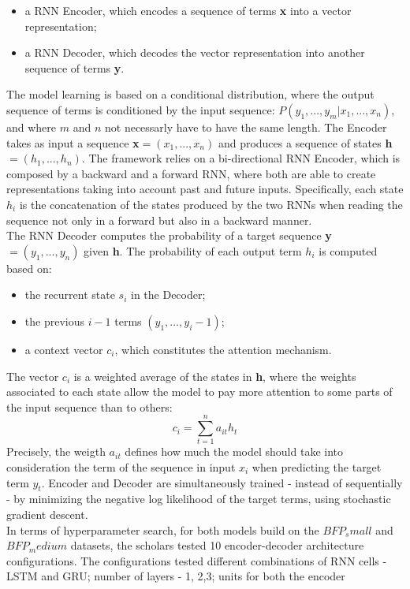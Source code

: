 \begin{itemize}
    \item a RNN Encoder, which encodes a sequence of terms \textbf{x} into a vector representation;
    \item a RNN Decoder, which decodes the vector representation into another sequence of terms \textbf{y}.
\end{itemize}
The model learning is based on a conditional distribution, where the output sequence of terms is conditioned
by the input sequence: \(P(y_1,...,y_m|x_1,...,x_n)\), and where \(m\) and \(n\) not necessarly have to have the same length.
The Encoder takes as input a sequence \textbf{x}\(= (x_1,...,x_n)\) and produces
a sequence of states \textbf{h}\(= (h_1,...,h_n)\). The framework relies on a bi-directional
RNN Encoder, which is composed by a backward and a forward RNN, where both are able to create representations taking into account
past and future inputs. Specifically, each state \(h_i\) is the concatenation of the states produced by 
the two RNNs when reading the sequence not only in a forward but also in a backward manner.\\
The RNN Decoder computes the probability of a target sequence \textbf{y}\(= (y_1,...,y_n)\) given \textbf{h}. 
The probability
of each output term \(h_i\) is computed based on:
\begin{itemize}
    \item the recurrent state \(s_i\) in the Decoder;
    \item the previous \(i - 1\) terms \((y_1,...,y_i-1)\);
    \item a context vector \(c_i\), which constitutes the attention mechanism.
\end{itemize}
The vector \(c_i\) is a weighted average of the states in \textbf{h}, where the weights associated 
to each state allow the model to pay more attention to some parts of the input sequence than to others:
\[c_i = \sum_{t=1}^n a_{it} h_t\]
Precisely, the weigth \(a_{it}\) defines how much the model should take into consideration the term of the sequence in input \(x_i\)
when predicting the target term \(y_t\). Encoder and Decoder are simultaneously trained - instead of sequentially - by minimizing
the negative log likelihood of the target terms, using stochastic gradient descent.\\
In terms of hyperparameter search, for both models build on the \(BFP_small\) and \(BFP_medium\) datasets,
the scholars tested 10 encoder-decoder architecture configurations. The configurations 
tested different combinations of RNN cells - LSTM and GRU; number of layers - 1, 2,3; units for both the encoder
